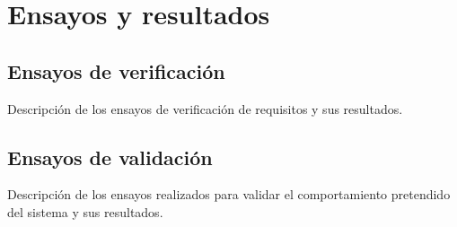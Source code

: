 \chapter{Ensayos y resultados}

\label{Chapter4}

\section{Ensayos de verificación}

Descripción de los ensayos de verificación de requisitos y sus resultados.

\section{Ensayos de validación}

Descripción de los ensayos realizados para validar el comportamiento pretendido del sistema y sus resultados.

